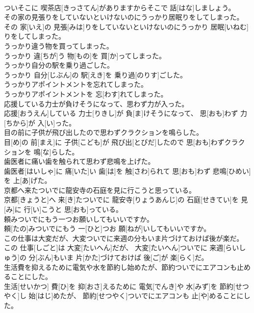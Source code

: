 \documentclass[8pt]{extreport}
\begin{document}
\begin{CJK}{UTF8}{min}
\\	ついそこに 喫茶店[きっさてん]がありますからそこで 話[はな]しましょう。
\\	その家の見張りをしていないといけないのにうっかり居眠りをしてしまった。	
\\	その 家[いえ]の 見張[みは]りをしていないといけないのにうっかり 居眠[いねむ]りをしてしまった。
\\	うっかり違う物を買ってしまった。	
\\	うっかり 違[ちが]う 物[もの]を 買[か]ってしまった。
\\	うっかり自分の駅を乗り過ごした。	
\\	うっかり 自分[じぶん]の 駅[えき]を 乗り過[のりす]ごした。
\\	うっかりアポイントメントを忘れてしまった。	
\\	うっかりアポイントメントを 忘[わす]れてしまった。
\\	応援している力士が負けそうになって、思わず力が入った。	
\\	応援[おうえん]している 力士[りきし]が 負[ま]けそうになって、 思[おも]わず 力[ちから]が 入[い]った。
\\	目の前に子供が飛び出したので思わずクラクションを鳴らした。	
\\	目[め]の 前[まえ]に 子供[こども]が 飛び出[とびだ]したので 思[おも]わずクラクションを 鳴[な]らした。
\\	歯医者に痛い歯を触られて思わず悲鳴を上げた。	
\\	歯医者[はいしゃ]に 痛[いた]い 歯[は]を 触[さわ]られて 思[おも]わず 悲鳴[ひめい]を 上[あ]げた。
\\	京都へ来たついでに龍安寺の石庭を見に行こうと思っている。	
\\	京都[きょうと]へ 来[き]たついでに 龍安寺[りょうあんじ]の 石庭[せきてい]を 見[み]に 行[い]こうと 思[おも]っている。
\\	頼みついでにもう一つお願いしてもいいですか。	
\\	頼[たの]みついでにもう 一[ひと]つお 願[ねが]いしてもいいですか。
\\	この仕事は大変だが、大変ついでに来週の分もいま片づけておけば後が楽だ。	
\\	この 仕事[しごと]は 大変[たいへん]だが、 大変[たいへん]ついでに 来週[らいしゅう]の 分[ぶん]もいま 片[かた]づけておけば 後[ご]が 楽[らく]だ。
\\	生活費を抑えるために電気や水を節約し始めたが、節約ついでにエアコンも止めることにした。	
\\	生活[せいかつ] 費[ひ]を 抑[おさ]えるために 電気[でんき]や 水[みず]を 節約[せつやく]し 始[はじ]めたが、 節約[せつやく]ついでにエアコンも 止[や]めることにした。

\end{CJK}
\end{document}
